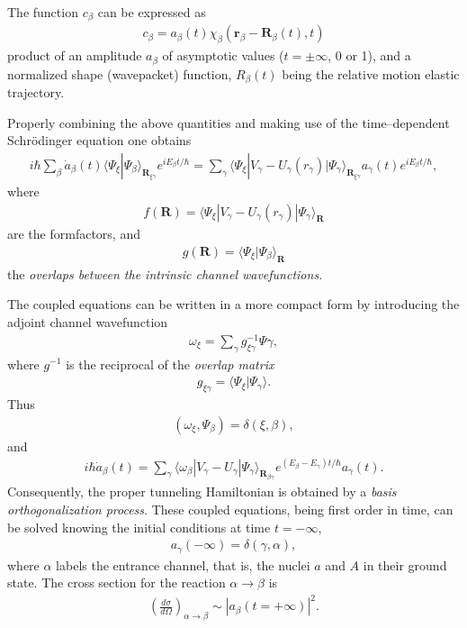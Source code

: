 The function $c_\beta$ can be expressed as
\begin{align}
c_\beta=a_\beta(t)\chi_\beta(\mathbf r_\beta-\mathbf R_\beta(t),t)
\end{align}
product of an amplitude $a_\beta$ of asymptotic values ($t=\pm\infty$, 0 or 1), and a normalized shape (wavepacket) function, $R_\beta(t)$ being the relative motion elastic trajectory.


Properly combining the above quantities and making use of the time--dependent Schr\"odinger equation one obtains 
\begin{align}
i\hbar\sum_{\beta}\dot a_\beta(t)\langle\Psi_\xi|\Psi_\beta\rangle_{\mathbf R_{\xi\gamma}}e^{iE_\beta t/\hbar}=\sum_{\gamma}\langle\Psi_\xi|V_\gamma-U_\gamma(r_\gamma)|\Psi_\gamma\rangle_{\mathbf R_{\xi\gamma}}a_\gamma(t)e^{iE_\beta t/\hbar},
\end{align}
where
\begin{align}
f(\mathbf R)=\langle\Psi_\xi|V_\gamma-U_\gamma(r_\gamma)|\Psi_\gamma\rangle_{\mathbf R}
\end{align}
are the formfactors, and
\begin{align}
g(\mathbf R)=\langle\Psi_\xi|\Psi_\beta\rangle_{\mathbf R}
\end{align}
the \textit{overlaps between the intrinsic channel wavefunctions}.



The coupled equations can be written in a more compact form by introducing the adjoint channel wavefunction 
\begin{align}
\omega_\xi=\sum_{\gamma}g_{\xi\gamma}^{-1}\Psi{\gamma},
\end{align}
where $g^{-1}$ is the reciprocal of the \textit{overlap matrix}
\begin{align}
g_{\xi\gamma}=\langle\Psi_\xi|\Psi_\gamma\rangle.
\end{align}
Thus
\begin{align}
(\omega_\xi,\Psi_\beta)=\delta(\xi,\beta),
\end{align}
and
\begin{align}
i\hbar\dot a_\beta(t)=\sum_{\gamma}\langle\omega_\beta|V_\gamma-U_\gamma|\Psi_\gamma\rangle_{\mathbf R_{\beta\gamma}}e^{(E_\beta-E_\gamma)t/\hbar}a_\gamma(t).
\end{align}
Consequently, the proper tunneling Hamiltonian is obtained by a \textit{basis orthogonalization process}. These coupled equations, being first order in time, can be solved knowing the initial conditions at time $t=-\infty$,
\begin{align}
a_\gamma(-\infty)=\delta(\gamma,\alpha),
\end{align}
where $\alpha$ labels the entrance channel, that is, the nuclei $a$ and $A$ in their ground state. The cross section for the reaction $\alpha\rightarrow\beta$ is
\begin{align}
\left(\frac{d\sigma}{d\Omega}\right)_{\alpha\rightarrow\beta}\sim\left|a_\beta(t=+\infty)\right|^2.
\end{align}



